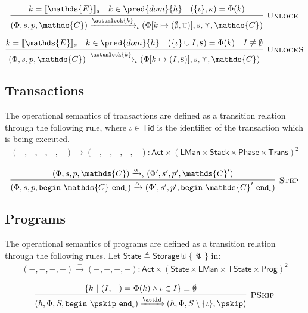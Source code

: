 \[
\infer[\textsc{Unlock}]
{
	(\Phi, s, p, \mathds{C})
	\xrightarrow{\actunlock{k}}_\iota
	(\Phi[k \mapsto (\emptyset, \textsc{u})], s, \curlyvee, \mathds{C})
}
{
	k = \llbracket \mathds{E} \rrbracket_s &
	k \in \pred{dom}{h} &
	(\{\iota\}, \kappa) = \Phi(k)
}
\]

\[
\infer[\textsc{UnlockS}]
{
	(\Phi, s, p, \mathds{C})
	\xrightarrow{\actunlock{k}}_\iota
	(\Phi[k \mapsto (I, \textsc{s})], s, \curlyvee, \mathds{C})
}
{
	k = \llbracket \mathds{E} \rrbracket_s &
	k \in \pred{dom}{h} &
	(\{\iota\} \cup I, \textsc{s}) = \Phi(k) &
	I \not\equiv \emptyset
}
\]

\subsection{Transactions}
The operational semantics of transactions are defined as a transition relation through the following rule, where $\iota \in \mathsf{Tid}$ is the identifier of the transaction which is being executed.
\begin{gather*}
(-, -, -, -, -) \xrightarrow{-} (-, -, -, -, -) : \mathsf{Act} \times (\mathsf{LMan} \times \mathsf{Stack} \times \mathsf{Phase} \times \mathsf{Trans})^2
\end{gather*}

\[
\infer[\textsc{Step}]
{
	(\Phi, s, p, \mathtt{begin}\ \mathds{C}\ \mathtt{end}_\iota)
	\xrightarrow{\alpha}
	(\Phi', s', p', \mathtt{begin}\ \mathds{C}'\ \mathtt{end}_\iota)
}
{
	(\Phi, s, p, \mathds{C})
	\xrightarrow{\alpha}_\iota
	(\Phi', s', p', \mathds{C}')
}
\]

\subsection{Programs}


The operational semantics of programs are defined as a transition relation through the following rules. Let $\mathsf{State} \triangleq \mathsf{Storage} \uplus \{\lightning\}$ in:
\begin{gather*}
(-, -, -, -) \xrightarrow{-} (-, -, -, -) 
: \mathsf{Act} \times (\mathsf{State} \times \mathsf{LMan} \times \mathsf{TState} \times \mathsf{Prog})^2
\end{gather*}

\[
\infer[\textsc{PSkip}]
{
	 (h, \Phi, S, \mathtt{begin}\ \pskip\ \mathtt{end}_\iota)
	\xrightarrow{\actid}
	(h, \Phi, S \setminus \{\iota\}, \pskip)
}
{
	\{ k\ |\ (I, -) = \Phi(k) \land \iota \in I \} \equiv \emptyset
}
\]

